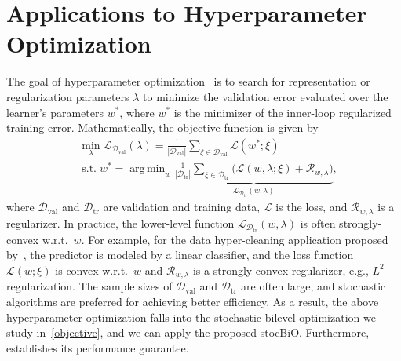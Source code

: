 \documentclass{osudissert96}
\def\gD{{\mathcal{D}}}
\def\gL{{\mathcal{L}}}
\def\gR{{\mathcal{R}}}
\def\gX{{\mathcal{X}}}
\def\gY{{\mathcal{Y}}}
\DeclareMathOperator*{\argmin}{arg\,min}
\begin{document}
\section{Applications to Hyperparameter Optimization}

The goal of hyperparameter optimization~\cite{franceschi2018bilevel,feurer2019hyperparameter} is to search for representation or regularization parameters  $\lambda$ to minimize the validation error evaluated over the learner's parameters $w^*$,  
 where $w^*$ is the minimizer of the inner-loop regularized  training error. Mathematically, the objective function is given by 
\begin{align}\label{obj:hyper_opt}
&\min_\lambda \gL_{\gD_{\text{val}}}(\lambda) = \frac{1}{|\gD_{\text{val}}|}\sum_{\xi\in \gD_{\text{val}}} \gL(w^*; \xi) \nonumber
\\& \;\mbox{s.t.} \; w^*= \argmin_{w} \underbrace{\frac{1}{|\gD_{\text{tr}}|}\sum_{\xi\in \gD_{\text{tr}}} \big(\gL(w,\lambda;\xi)  + \gR_{w,\lambda}\big)}_{\gL_{\gD_{\text{tr}}}(w,\lambda)},
\end{align}
where $\gD_{\text{val}}$ and $\gD_{\text{tr}}$ are validation and training data,  $\gL$ is the loss, and $\gR_{w,\lambda}$ is a regularizer. In practice,  the lower-level function $\gL_{\gD_{\text{tr}}}(w,\lambda)$ is often strongly-convex w.r.t.~$w$. For example, for the data hyper-cleaning application proposed by~\cite{franceschi2018bilevel,shaban2019truncated}, the predictor is modeled by a linear classifier, and  the 
loss function $\gL(w;\xi)  $ is convex w.r.t.~$w$ and $\gR_{w,\lambda}$ is a strongly-convex regularizer, e.g., $L^2$ regularization.  
The sample sizes of  $\gD_{\text{val}}$ and $\gD_{\text{tr}}$ are often large, and stochastic algorithms are preferred for achieving better efficiency. 
As a result, the above hyperparameter optimization falls into the stochastic bilevel optimization we study in~\cref{objective}, and we can apply the proposed stocBiO. Furthermore,  establishes its performance guarantee. 
\end{document}
